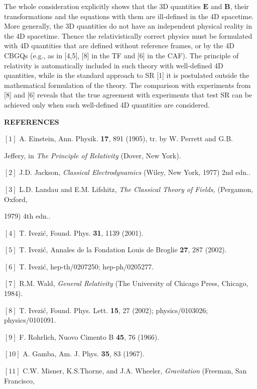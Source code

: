 \documentclass[a4paper,showpacs,preprintnumbers,amsmath,amssymb]{revtex4}
\begin{document}
The whole consideration explicitly shows that the 3D quantities $\mathbf{E}$
and $\mathbf{B}$, their transformations and the equations with them are
ill-defined in the 4D spacetime. More generally, the 3D quantities do not
have an independent physical reality in the 4D spacetime. Thence the
relativistically correct physics must be formulated with 4D quantities that
are defined without reference frames, or by the 4D CBGQs (e.g., as in [4,5],
[8] in the TF and [6] in the CAF). The principle of relativity is
automatically included in such theory with well-defined 4D quantities, while
in the standard approach to SR [1] it is postulated outside the mathematical
formulation of the theory. The comparison with experiments from [8] and [6]
reveals that the true agreement with experiments that test SR can be
achieved only when such well-defined 4D quantities are considered.\bigskip

\noindent \textbf{REFERENCES}\bigskip

\noindent $\left[ 1\right] $ A. Einstein, Ann. Physik. \textbf{17}, 891
(1905), tr. by W. Perrett and G.B.

Jeffery, in \textit{The Principle of Relativity} (Dover, New York).

\noindent $\left[ 2\right] $ J.D. Jackson, \textit{Classical Electrodynamics}
(Wiley, New York, 1977) 2nd edn..

\noindent $\left[ 3\right] $ L.D. Landau and E.M. Lifshitz, \textit{The
Classical Theory of Fields,} (Pergamon, Oxford,

1979) 4th edn..

\noindent $\left[ 4\right] $ T. Ivezi\'{c}, Found. Phys. \textbf{31}, 1139
(2001).

\noindent $\left[ 5\right] $ T. Ivezi\'{c}, Annales de la Fondation Louis de
Broglie \textbf{27}, 287 (2002).

\noindent $\left[ 6\right] $ T. Ivezi\'{c}, hep-th/0207250; hep-ph/0205277.

\noindent $\left[ 7\right] $ R.M. Wald, \textit{General Relativity} (The
University of Chicago Press, Chicago, 1984).

\noindent $\left[ 8\right] $ T. Ivezi\'{c}, Found. Phys. Lett. \textbf{15},
27 (2002); physics/0103026; physics/0101091.

\noindent $\left[ 9\right] $ F. Rohrlich, Nuovo Cimento B \textbf{45}, 76
(1966).

\noindent $\left[ 10\right] $ A. Gamba, Am. J. Phys. \textbf{35}, 83 (1967).

\noindent $\left[ 11\right] $ C.W. Misner, K.S.Thorne, and J.A. Wheeler,
\textit{Gravitation} (Freeman, San Francisco,
\end{document}
